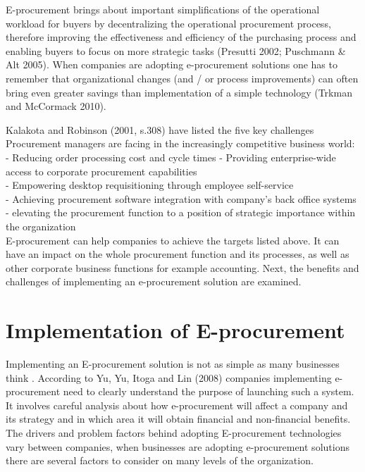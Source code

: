 E-procurement brings about important simplifications of the operational workload for buyers by decentralizing the operational procurement process, therefore improving the effectiveness and efficiency of the purchasing process and enabling buyers to focus on more strategic tasks (Presutti 2002; Puschmann \& Alt 2005). When companies are adopting e-procurement solutions one has to remember that organizational changes (and / or process improvements) can often bring even greater savings than implementation of a simple technology (Trkman and McCormack 2010). 

Kalakota and Robinson (2001, s.308) have listed the five key challenges Procurement managers are facing in the increasingly competitive business world: \\
- Reducing order processing cost and cycle times 
- Providing enterprise-wide access to corporate procurement capabilities \\
- Empowering desktop requisitioning through employee self-service \\
- Achieving procurement software integration with company's back office systems \\
- elevating the procurement function to a position of strategic importance within the organization \\
E-procurement can help companies to achieve the targets listed above. It can have an impact on the whole procurement function and its processes, as well as other corporate business functions for example accounting. Next, the benefits and challenges of implementing an e-procurement solution are examined.

\section{Implementation of E-procurement}
Implementing an E-procurement solution is not as simple as many businesses think \citet{croom2005,angels2007}.  According to Yu, Yu, Itoga and Lin (2008) companies implementing e-procurement need to clearly understand the purpose of launching such a system. It involves careful analysis about how e-procurement will affect a company and its strategy and in which area it will obtain financial and non-financial benefits. The drivers and problem factors behind adopting E-procurement technologies vary between companies, when businesses are adopting e-procurement solutions there are several factors to consider on many levels of the organization. 

